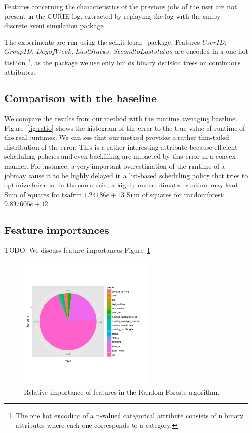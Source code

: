 \documentclass{article}
\begin{document}
Features concerning the characteristics of the previous jobs of the user are not present in the CURIE log. extracted by replaying the log with the simpy~\cite{simpy} discrete event simulation package.

The experiments are run using the scikit-learn~\cite{scikit-learn} package. Features $User ID$, $ Group ID$, $ Day of Week$, $ Last Status$, $ Second to Last status$ are encoded in a one-hot fashion \footnote{The one hot encoding of a n-valued categorical attribute consists of n binary attributes where each one corresponds to a category.}, as the package we use only builds binary decision trees on continuous attributes.

\subsection{Comparison with the baseline}
\label{sub:comparison_with_average_baseline}
We compare the results from our method with the runtime averaging baseline.
Figure~\ref{fig:ratio} shows the histogram of the error to the true value of runtime of the real runtimes.
We can see that our method provides a rather thin-tailed distribution of the error.
This is a rather interesting attribute because efficient scheduling policies and even backfilling are impacted by this error in a convex manner. For instance, a very important overestimation of the runtime of a jobmay cause it to be highly delayed in a list-based scheduling policy that tries to optimize fairness. In the same vein, a highly underestimated runtime may lead
Sum of squares for tsafrir: $1.24186e+13$
Sum of squares for randomforest: $9.897605e+12$

\subsection{Feature importances}
\label{sub:feature_importances}
TODO:
We discuss feature importances \lots Figure~\ref{fig:importances}

\begin{figure}[ht]
  \includegraphics[width=0.6\textwidth]{../../pie.png}
  \caption{Relative importance of features in the Random Forests algorithm.}
  \label{fig:importances}
\end{figure}
\end{document}
